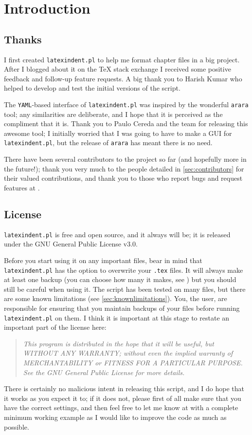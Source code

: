 \documentclass[10pt]{article}
\begin{document}
\section{Introduction}
\subsection{Thanks}
 I first created \texttt{latexindent.pl} to help me format chapter files in a big project.
 After I blogged about it on the \TeX{} stack exchange \cite{cmhblog} I received some
 positive feedback and follow-up feature requests. A big thank you to Harish Kumar
 \cite{harish} who helped to develop and test the initial versions of the script.

 The \texttt{YAML}-based interface of \texttt{latexindent.pl} was inspired by the
 wonderful \texttt{arara} tool; any similarities are deliberate, and I hope that it is
 perceived as the compliment that it is. Thank you to Paulo Cereda and the team for
 releasing this awesome tool; I initially worried that I was going to have to make a GUI
 for \texttt{latexindent.pl}, but the release of \texttt{arara} has meant there is no
 need.

 There have been several contributors to the project so far (and hopefully more in the
 future!); thank you very much to the people detailed in \vref{sec:contributors} for
 their valued contributions, and thank you to those who report bugs and request features
 at \cite{latexindent-home}.

\subsection{License}
 \texttt{latexindent.pl} is free and open source, and it always will be; it
 is released under the GNU General Public License v3.0.

 Before you start using it on any important files, bear in mind that
 \texttt{latexindent.pl} has the option to overwrite your \texttt{.tex} files. It will
 always make at least one backup (you can choose how many it makes, see
 ) but you should still be careful when using it. The script
 has been tested on many files, but there are some known limitations (see
 \cref{sec:knownlimitations}). You, the user, are responsible for ensuring that you
 maintain backups of your files before running \texttt{latexindent.pl} on them. I think
 it is important at this stage to restate an important part of the license here:
 \begin{quote}\itshape
  This program is distributed in the hope that it will be useful,
  but WITHOUT ANY WARRANTY; without even the implied warranty of
  MERCHANTABILITY or FITNESS FOR A PARTICULAR PURPOSE. See the
  GNU General Public License for more details.
 \end{quote}
 There is certainly no malicious intent in releasing this script, and I do hope that it
 works as you expect it to; if it does not, please first of all make sure that you have
 the correct settings, and then feel free to let me know at \cite{latexindent-home} with
 a complete minimum working example as I would like to improve the code as much as
 possible.
\end{document}

